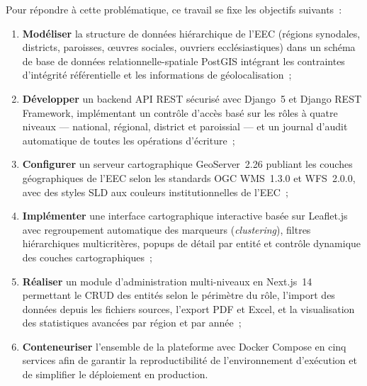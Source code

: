 \documentclass[12pt, a4paper]{report}
\begin{document}
\medskip

Pour répondre à cette problématique, ce travail se fixe les objectifs suivants~:

\begin{enumerate}[leftmargin=1.5cm, itemsep=2pt, topsep=4pt]
  \item \textbf{Modéliser} la structure de données hiérarchique de l'EEC
    (régions synodales, districts, paroisses, œuvres sociales, ouvriers
    ecclésiastiques) dans un schéma de base de données relationnelle-spatiale
    PostGIS intégrant les contraintes d'intégrité référentielle et les
    informations de géolocalisation~;

  \item \textbf{Développer} un backend API REST sécurisé avec Django~5 et
    Django REST Framework, implémentant un contrôle d'accès basé sur les rôles
    à quatre niveaux --- national, régional, district et paroissial --- et un
    journal d'audit automatique de toutes les opérations d'écriture~;

  \item \textbf{Configurer} un serveur cartographique GeoServer~2.26 publiant
    les couches géographiques de l'EEC selon les standards OGC WMS~1.3.0 et
    WFS~2.0.0, avec des styles SLD aux couleurs institutionnelles de l'EEC~;

  \item \textbf{Implémenter} une interface cartographique interactive basée sur
    Leaflet.js avec regroupement automatique des marqueurs (\textit{clustering}),
    filtres hiérarchiques multicritères, popups de détail par entité et contrôle
    dynamique des couches cartographiques~;

  \item \textbf{Réaliser} un module d'administration multi-niveaux en Next.js~14
    permettant le CRUD des entités selon le périmètre du rôle, l'import des
    données depuis les fichiers sources, l'export PDF et Excel, et la
    visualisation des statistiques avancées par région et par année~;

  \item \textbf{Conteneuriser} l'ensemble de la plateforme avec Docker Compose
    en cinq services afin de garantir la reproductibilité de l'environnement
    d'exécution et de simplifier le déploiement en production.
\end{enumerate}

\medskip
\end{document}
